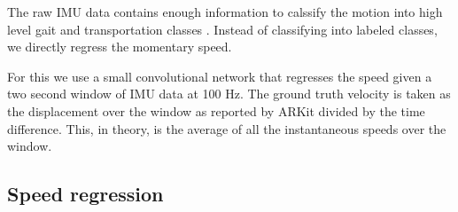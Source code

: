 \documentclass{article}
\begin{document}
The raw IMU data contains enough information to calssify the motion into high level gait and transportation classes \cite{Yan+Shan+Furukawa:2017}. Instead of classifying into labeled classes, we directly regress the momentary speed. 

For this we use a small convolutional network that regresses the speed given a two second window of IMU data at 100 Hz. The ground truth velocity is taken as the displacement over the window as reported by ARKit divided by the time difference. This, in theory, is the average of all the instantaneous speeds over the window.

\subsection{Speed regression}
\end{document}
